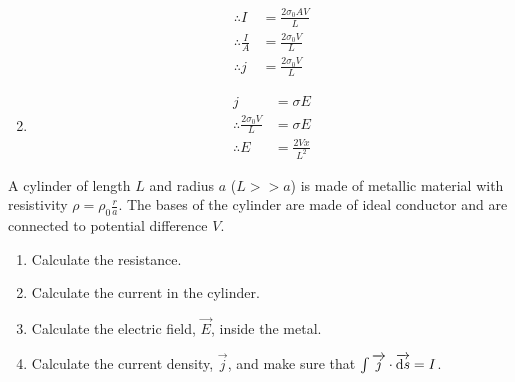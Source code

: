 \documentclass[fleqn, a4paper, 12pt, twoside]{article}
\theoremstyle{definition}
\theoremstyle{theorem}
\begin{document}
\begin{solution}
\begin{enumerate}[leftmargin = *]
\begin{align*}
				\therefore I           & = \frac{2 \sigma_0 A V}{L} \\
				\therefore \frac{I}{A} & = \frac{2 \sigma_0 V}{L}   \\
				\therefore j           & = \frac{2 \sigma_0 V}{L}
			\end{align*}
		\item
			\begin{align*}
				j                                 & = \sigma E \\
				\therefore \frac{2 \sigma_0 V}{L} & = \sigma E \\
				\therefore E                      & = \frac{2 V x}{L^2}
			\end{align*}
	\end{enumerate}
\end{solution}

\addtocounter{question}{1}

\begin{question}
	A cylinder of length $L$ and radius $a$ ($L >> a$) is made of metallic material with resistivity $\rho = \rho_0 \frac{r}{a}$.
	The bases of the cylinder are made of ideal conductor and are connected to potential difference $V$.
	\begin{enumerate}
		\item Calculate the resistance.
		\item Calculate the current in the cylinder.
		\item Calculate the electric field, $\overrightarrow{E}$, inside the metal.
		\item Calculate the current density, $\overrightarrow{j}$, and make sure that $\int \overrightarrow{j} \cdot \overrightarrow{\dif s} = I$.
	\end{enumerate}
\end{question}
\end{document}
